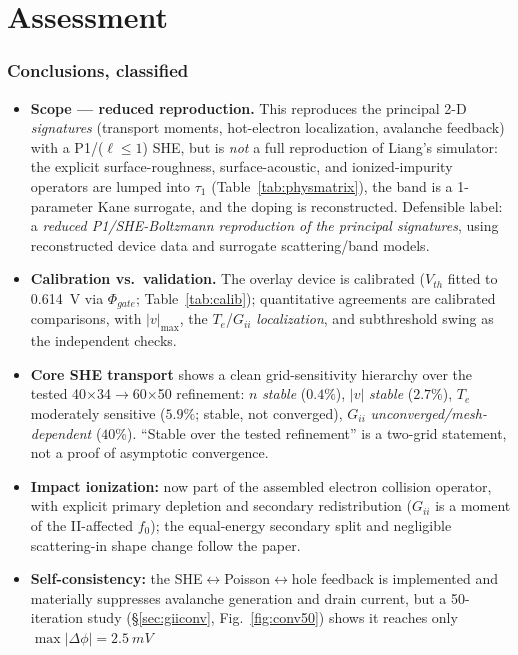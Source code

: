 \documentclass[11pt]{article}
\begin{document}
\part{Assessment}
\section{Conclusions, classified}\label{sec:concl}
\begin{itemize}[leftmargin=1.4em,itemsep=2pt]
\item \textbf{Scope --- reduced reproduction.} This reproduces the principal 2-D \emph{signatures}
(transport moments, hot-electron localization, avalanche feedback) with a P1/($\ell\le1$) SHE, but
is \emph{not} a full reproduction of Liang's simulator: the explicit surface-roughness,
surface-acoustic, and ionized-impurity operators are lumped into $\tau_1$
(Table~\ref{tab:physmatrix}), the band is a 1-parameter Kane surrogate, and the doping is
reconstructed. Defensible label: a \emph{reduced P1/SHE-Boltzmann reproduction of the principal
signatures}, using reconstructed device data and surrogate scattering/band models.
\item \textbf{Calibration vs.\ validation.} The overlay device is calibrated ($V_{th}$ fitted to
\SI{0.614}{V} via $\Phi_{gate}$; Table~\ref{tab:calib}); quantitative agreements are calibrated
comparisons, with $|v|_{\max}$, the $T_e$/$G_{ii}$ \emph{localization}, and subthreshold swing as
the independent checks.
\item \textbf{Core SHE transport} shows a clean grid-sensitivity hierarchy over the tested
40$\times$34$\to$60$\times$50 refinement: $n$ \emph{stable} ($0.4\%$), $|v|$ \emph{stable}
($2.7\%$), $T_e$ moderately sensitive ($5.9\%$; stable, not converged), $G_{ii}$
\emph{unconverged/mesh-dependent} ($40\%$). ``Stable over the tested refinement'' is a two-grid
statement, not a proof of asymptotic convergence.
\item \textbf{Impact ionization:} now part of the assembled electron collision operator, with
explicit primary depletion and secondary redistribution ($G_{ii}$ is a moment of the II-affected
$f_0$); the equal-energy secondary split and negligible scattering-in shape change follow the
paper.
\item \textbf{Self-consistency:} the SHE$\leftrightarrow$Poisson$\leftrightarrow$hole feedback is
implemented and materially suppresses avalanche generation and drain current, but a 50-iteration
study (\S\ref{sec:giiconv}, Fig.~\ref{fig:conv50}) shows it reaches only $\max|\Delta\phi|=\SI{2.5}{mV}$

\end{itemize}
\end{document}
